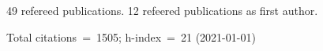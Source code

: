49 refereed publications. 12 refeered publications as first author.

Total citations~=~1505; h-index~=~21 (2021-01-01)